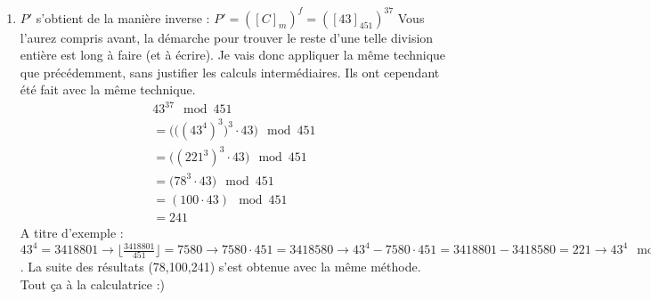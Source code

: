 \documentclass[10p,a4paper]{scrartcl}
\begin{document}
\begin{enumerate}
	\item	$P'$ s'obtient de la manière inverse : $P' = ([C]_{m})^{f} = ([43]_{451})^{37}$ Vous l'aurez compris avant, la démarche pour trouver le reste d'une telle division entière est long à faire (et à écrire). Je vais donc appliquer la même technique que précédemment, sans justifier les calculs intermédiaires. Ils ont cependant été fait avec la même technique.
			\begin{align*}
				43^{37} \mod 451\\
				=\Big(\big((43^4)^3\big)^3 \cdot 43 \Big) \mod 451\\
				= \big((221^3)^3 \cdot 43 \big) \mod 451\\
				= \big(78^3 \cdot 43 \big) \mod 451\\
				= (100 \cdot 43) \mod 451\\
				= 241
			\end{align*}
			A titre d'exemple : $43^4 = 3418801 \to \lfloor \frac{3418801}{451}\rfloor = 7580 \to 7580 \cdot 451 = 3418580 \to 43^4 - 7580\cdot 451 = 3418801 - 3418580 = 221 \to 43^4 \mod 451 = 221$. La suite des résultats (78,100,241) s'est obtenue avec la même méthode. Tout ça à la calculatrice :)
\end{enumerate}
\end{document}
